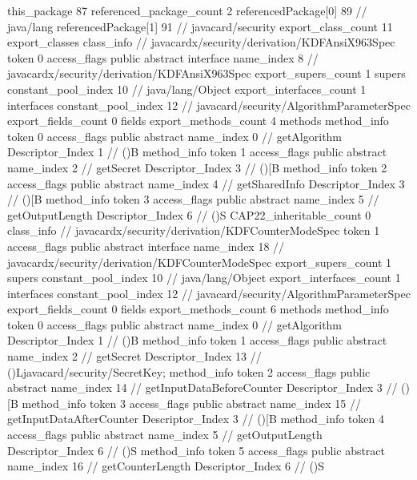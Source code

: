 {{{		}
	}
	this_package	87
	referenced_package_count	2
	referencedPackage[0]	89		// java/lang
	referencedPackage[1]	91		// javacard/security
	export_class_count	11
	export_classes {
		class_info {		// javacardx/security/derivation/KDFAnsiX963Spec
			token	0
			access_flags	public abstract interface
			name_index	8		// javacardx/security/derivation/KDFAnsiX963Spec
			export_supers_count	1
			supers {
				constant_pool_index	10		// java/lang/Object
			}
			export_interfaces_count	1
			interfaces {
				constant_pool_index	12		// javacard/security/AlgorithmParameterSpec
			}
			export_fields_count	0
			fields {
			}
			export_methods_count	4
			methods {
				method_info {
					token	0
					access_flags	public abstract
					name_index	0		// getAlgorithm
					Descriptor_Index	1		// ()B
				}
				method_info {
					token	1
					access_flags	public abstract
					name_index	2		// getSecret
					Descriptor_Index	3		// ()[B
				}
				method_info {
					token	2
					access_flags	public abstract
					name_index	4		// getSharedInfo
					Descriptor_Index	3		// ()[B
				}
				method_info {
					token	3
					access_flags	public abstract
					name_index	5		// getOutputLength
					Descriptor_Index	6		// ()S
				}
			}
			CAP22_inheritable_count	0
		}
		class_info {		// javacardx/security/derivation/KDFCounterModeSpec
			token	1
			access_flags	public abstract interface
			name_index	18		// javacardx/security/derivation/KDFCounterModeSpec
			export_supers_count	1
			supers {
				constant_pool_index	10		// java/lang/Object
			}
			export_interfaces_count	1
			interfaces {
				constant_pool_index	12		// javacard/security/AlgorithmParameterSpec
			}
			export_fields_count	0
			fields {
			}
			export_methods_count	6
			methods {
				method_info {
					token	0
					access_flags	public abstract
					name_index	0		// getAlgorithm
					Descriptor_Index	1		// ()B
				}
				method_info {
					token	1
					access_flags	public abstract
					name_index	2		// getSecret
					Descriptor_Index	13		// ()Ljavacard/security/SecretKey;
				}
				method_info {
					token	2
					access_flags	public abstract
					name_index	14		// getInputDataBeforeCounter
					Descriptor_Index	3		// ()[B
				}
				method_info {
					token	3
					access_flags	public abstract
					name_index	15		// getInputDataAfterCounter
					Descriptor_Index	3		// ()[B
				}
				method_info {
					token	4
					access_flags	public abstract
					name_index	5		// getOutputLength
					Descriptor_Index	6		// ()S
				}
				method_info {
					token	5
					access_flags	public abstract
					name_index	16		// getCounterLength
					Descriptor_Index	6		// ()S
}}}}}
